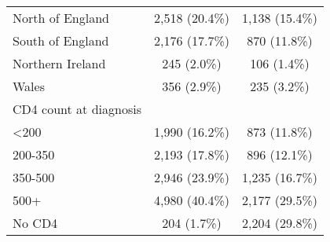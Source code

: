 \begin{table}[!h]
\begin{tabular}[t]{lcc}
\hspace{1em}North of England & 2,518 (20.4\%) & 1,138 (15.4\%)\\
\hspace{1em}South of England & 2,176 (17.7\%) & 870 (11.8\%)\\
\hspace{1em}Northern Ireland & 245 (2.0\%) & 106 (1.4\%)\\
\hspace{1em}Wales & 356 (2.9\%) & 235 (3.2\%)\\
CD4 count at diagnosis &  & \\
\hspace{1em}<200 & 1,990 (16.2\%) & 873 (11.8\%)\\
\hspace{1em}200-350 & 2,193 (17.8\%) & 896 (12.1\%)\\
\hspace{1em}350-500 & 2,946 (23.9\%) & 1,235 (16.7\%)\\
\hspace{1em}500+ & 4,980 (40.4\%) & 2,177 (29.5\%)\\
\hspace{1em}No CD4 & 204 (1.7\%) & 2,204 (29.8\%)\\
\bottomrule
\end{tabular}
\end{table}

